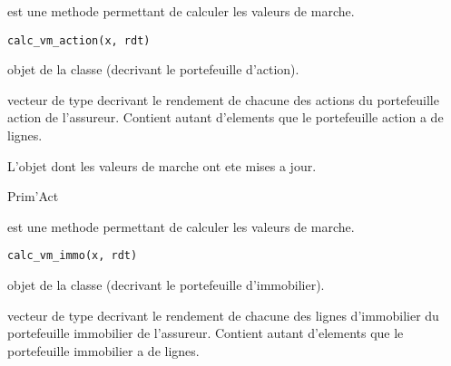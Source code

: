 \documentclass[a4paper]{book}
\begin{document}
%
\begin{Description}\relax
{} est une methode permettant de calculer les valeurs de marche.
\end{Description}
%
\begin{Usage}
\begin{verbatim}
calc_vm_action(x, rdt)
\end{verbatim}
\end{Usage}
%
\begin{Arguments}
\begin{ldescription}
\item[\code{x}] objet de la classe  (decrivant le portefeuille d'action).

\item[\code{rdt}] vecteur de type  decrivant le rendement de chacune des actions du portefeuille action de l'assureur.
Contient autant d'elements que le portefeuille action a de lignes.
\end{ldescription}
\end{Arguments}
%
\begin{Value}
L'objet  dont les valeurs de marche ont ete mises a jour.
\end{Value}
%
\begin{Author}\relax
Prim'Act
\end{Author}
%
\begin{Description}\relax
{} est une methode permettant de calculer les valeurs de marche.
\end{Description}
%
\begin{Usage}
\begin{verbatim}
calc_vm_immo(x, rdt)
\end{verbatim}
\end{Usage}
%
\begin{Arguments}
\begin{ldescription}
\item[\code{x}] objet de la classe  (decrivant le portefeuille d'immobilier).

\item[\code{rdt}] vecteur de type  decrivant le rendement de chacune des lignes d'immobilier du portefeuille immobilier de l'assureur.
Contient autant d'elements que le portefeuille immobilier a de lignes.
\end{ldescription}
\end{Arguments}
\end{document}
